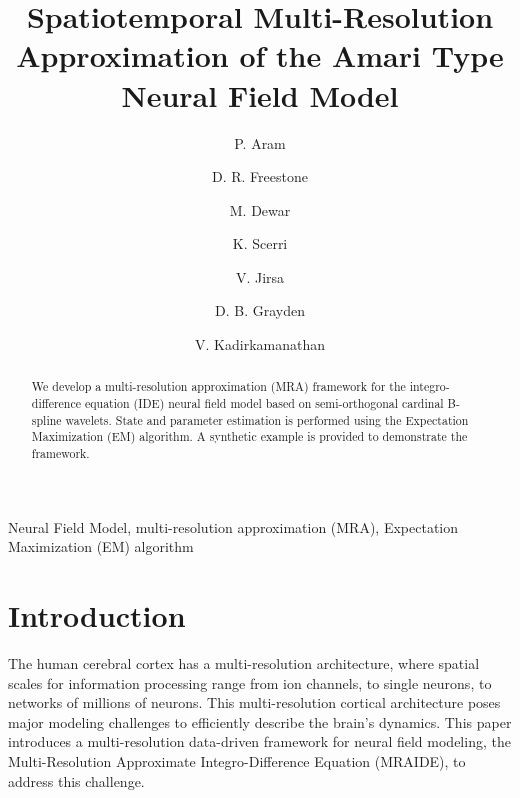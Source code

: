 \documentclass[review,authoryear,3p]{elsarticle}
\begin{document}
\begin{frontmatter}
\title{Spatiotemporal Multi-Resolution Approximation of the Amari Type Neural Field Model}
  
\author[TNG]{P. Aram}
\author[DEEE]{D. R. Freestone}
\author[CU]{M. Dewar}
\author[UM]{K. Scerri}
 \author[TNG]{V. Jirsa}
\author[DEEE]{D. B. Grayden}
\author[US]{V. Kadirkamanathan}

\address[TNG]{Theoretical Neuroscience Group, UMR 1106, Institut de Neurosciences des Systemes, 13385 Marseille, France}
\address[DEEE]{NeuroEngineering Laboratory, Department of Electrical and Electronic Engineering, University of Melbourne, Melbourne, VIC, Australia}
\address[CU]{Department of Applied Physics and Applied Mathematics, Columbia University, New York, NY, USA}
\address[UM]{Department of Systems and Control Engineering, University of Malta, Msida, MSD, Malta}
 \address[US]{Department of Automatic Control and Systems Engineering, University of Sheffield, Sheffield, UK}


\begin{abstract}
We develop a multi-resolution approximation (MRA) framework for the integro-difference equation (IDE) neural field model based on semi-orthogonal cardinal B-spline wavelets. State and parameter estimation is performed using the Expectation Maximization (EM) algorithm. A synthetic example is provided
to demonstrate the framework.
\end{abstract} 
\begin{keyword}
  Neural Field Model, multi-resolution approximation (MRA), Expectation Maximization (EM) algorithm
\end{keyword}

\end{frontmatter}


\section{Introduction}
The human cerebral cortex has a multi-resolution architecture, where spatial scales for information processing range from ion channels, to single neurons, to networks of millions of neurons. This multi-resolution cortical architecture poses major modeling challenges to efficiently describe the brain's dynamics. This paper introduces a multi-resolution data-driven framework for neural field modeling, the Multi-Resolution Approximate Integro-Difference Equation (MRAIDE), to address this challenge. 
\end{document}
